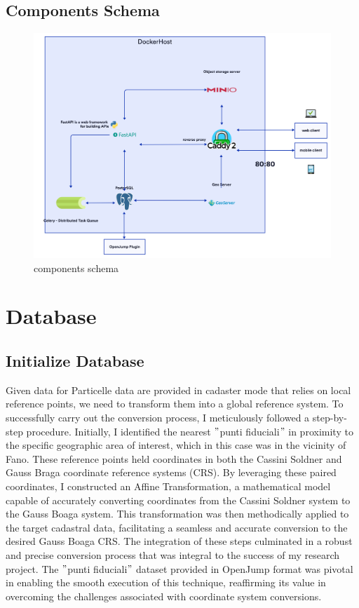 \newpage

\subsection{Components Schema}\label{subsec:components-schema}
\begin{figure}[H]
    \includegraphics[width=\textwidth]{res/components_schema}
    \caption{components schema}
    \label{fig:components-schema}
\end{figure}

\section{Database}\label{sec:database}
\subsection{Initialize Database}\label{subsec:database-implementation}
Given data for Particelle data are provided in cadaster mode that relies on local reference points, we need to transform them into a global reference system.
To successfully carry out the conversion process, I meticulously followed a step-by-step procedure.
Initially, I identified the nearest \("\)punti fiduciali\("\) in proximity to the specific geographic area of interest, which in this case was in the vicinity of Fano.
These reference points held coordinates in both the Cassini Soldner and Gauss Braga coordinate reference systems (CRS).
By leveraging these paired coordinates, I constructed an Affine Transformation, a mathematical model capable of accurately converting coordinates from the Cassini Soldner system to the Gauss Boaga system.
This transformation was then methodically applied to the target cadastral data, facilitating a seamless and accurate conversion to the desired Gauss Boaga CRS.
The integration of these steps culminated in a robust and precise conversion process that was integral to the success of my research project.
The \("\)punti fiduciali\("\) dataset provided in OpenJump format was pivotal in enabling the smooth execution of this technique, reaffirming its value in overcoming the challenges associated with coordinate system conversions.

